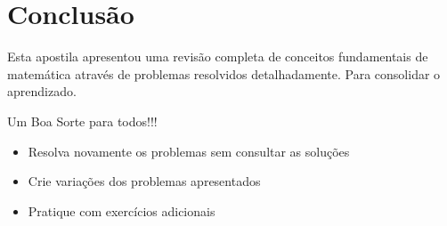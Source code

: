 \documentclass[11pt]{article}
\begin{document}
\section{Conclusão}
Esta apostila apresentou uma revisão completa de conceitos fundamentais de matemática através de problemas resolvidos detalhadamente. Para consolidar o aprendizado.

Um Boa Sorte para todos!!!

\begin{itemize}
\item Resolva novamente os problemas sem consultar as soluções
\item Crie variações dos problemas apresentados
\item Pratique com exercícios adicionais
\end{itemize}
\end{document}

